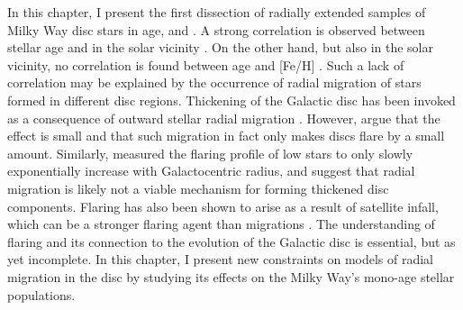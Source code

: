 
 In this chapter, I present the first dissection of radially extended samples of Milky Way disc stars in age, \feh{} and \afe{}. A strong correlation is observed between stellar age and \afe{} in the solar vicinity \citep{2013A&A...560A.109H}. On the other hand, but also in the solar vicinity, no correlation is found between age and [Fe/H] \citep[e.g.][]{1993A&A...275..101E,2004A&A...418..989N}. Such a lack of correlation may be explained by the occurrence of radial migration of stars formed in different disc regions. Thickening of the Galactic disc has been invoked as a consequence of outward stellar radial migration \citep[e.g.][]{2009MNRAS.399.1145S}. However, \citet{2012A&A...548A.127M} argue that the effect is small and that such migration in fact only makes discs flare by a small amount. Similarly, \citet{2016ApJ...823...30B} measured the flaring profile of low \afe{} stars to only slowly exponentially increase with Galactocentric radius, and suggest that radial migration is likely not a viable mechanism for forming thickened disc components. Flaring has also been shown to arise as a result of satellite infall, which can be a stronger flaring agent than migrations \citep[e.g.][]{2009ApJ...707L...1B}. The understanding of flaring and its connection to the evolution of the Galactic disc is essential, but as yet incomplete. In this chapter, I present new constraints on models of radial migration in the disc by studying its effects on the Milky Way's mono-age stellar populations. 

